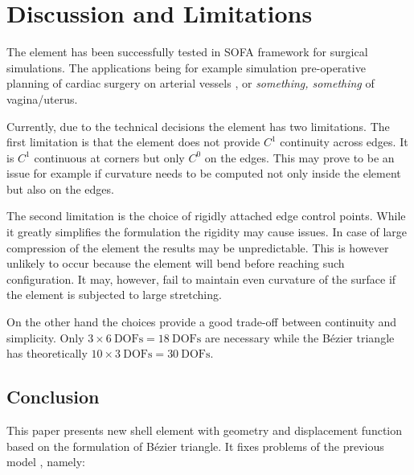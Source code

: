\documentclass{egpubl}
\begin{document}

\section{Discussion and Limitations} %

The element has been successfully tested in SOFA framework for surgical
simulations. The applications being for example simulation pre-operative
planning of cardiac surgery on arterial vessels \cite{Kislinskiy2012}, or
{\em something, something} of vagina/uterus.

%
%


Currently, due to the technical decisions the element has two limitations.
The first limitation is that the element does not provide $C^1$ continuity
across edges. It is $C^1$ continuous at corners but only $C^0$ on the
edges. This may prove to be an issue for example if curvature needs to be
computed not only inside the element but also on the edges.

The second limitation is the choice of rigidly attached edge control
points. While it greatly simplifies the formulation the rigidity may cause
issues. In case of large compression of the element the results may be
unpredictable. This is however unlikely to occur because the element will
bend before reaching such configuration. It may, however, fail to maintain
even curvature of the surface if the element is subjected to large
stretching.

On the other hand the choices provide a good trade-off between continuity
and simplicity. Only $ 3 \times 6~\mathrm{DOFs} = 18~\mathrm{DOFs}$ are
necessary while the Bézier triangle has theoretically $ 10 \times
3~\mathrm{DOFs} = 30~\mathrm{DOFs}$.


\subsection{Conclusion} %

This paper presents new shell element with geometry and displacement
function based on the formulation of Bézier triangle. It fixes problems
of the previous model \cite{Comas2010c}, namely:
\end{document}
